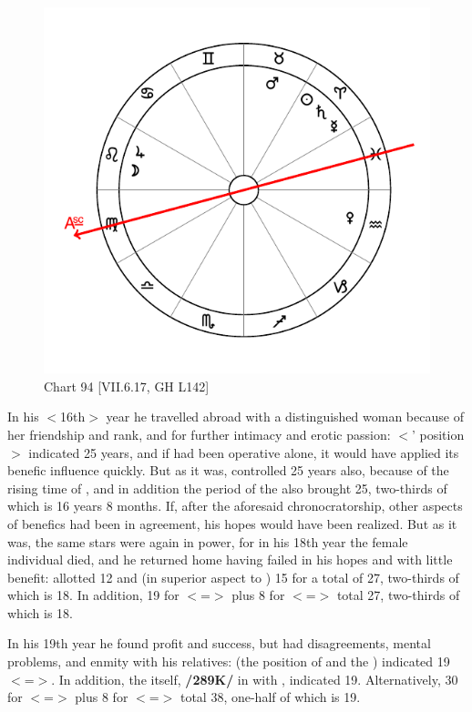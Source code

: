\begin{figure}
\centering
\vspace{-20pt}
\includegraphics[width=.68\textwidth]{charts/7_6_17}
\caption{Chart 94 [VII.6.17, GH L142] }
\label{fig:chart94}
\end{figure} 

In his $<$16th$>$ year he travelled abroad with a distinguished
woman because of her friendship and rank, and for further intimacy and erotic passion: \Aquarius\xspace $<$\Venus’ position$>$ indicated 25 years, and if \Venus\xspace had been operative alone, it would have applied its benefic influence quickly. But as it was, \Mars\xspace controlled 25 years also, because of the rising time of \Taurus, and in addition the period of the \Moon\xspace also brought 25, two-thirds of which is 16 years 8 months. If, after the aforesaid chronocratorship, other aspects of benefics had been in agreement, his hopes would have been realized. But as it was, the same stars were again in power, for in his 18th year the female individual died,
and he returned home having failed in his hopes and with little benefit: \Jupiter\xspace allotted 12 and \Mars\xspace (in superior aspect to \Jupiter) 15 for a total of 27, two-thirds of which is 18. In addition, 19 for \Leo\xspace $<$=\Sun$>$ plus 8 for \Taurus\xspace $<$=\Venus$>$ total 27, two-thirds of which is 18.

In his 19th year he found profit and success, but had disagreements, mental problems, and enmity with his relatives: \Leo\xspace (the position of \Jupiter\xspace and the \Moon) indicated 19 $<$=\Sun$>$. In addition, the \Sun\xspace itself, \textbf{/289K/} in \Aries\xspace with \Saturn, indicated 19. Alternatively, 30 for \Aquarius\xspace $<$=\Saturn$>$ plus 8 for \Taurus\xspace
$<$=\Venus$>$ total 38, one-half of which is 19. 

